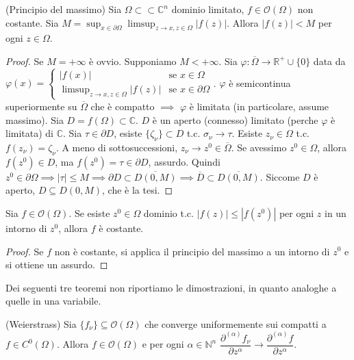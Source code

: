 \begin{thm}
  (Principio del massimo) Sia $\Omega \subset\subset \mathbb{C}^n$ dominio limitato, $f \in \mathcal{O}(\Omega)$ non costante. Sia $\displaystyle M=\sup_{x \in \partial \Omega} \limsup_{z \longrightarrow x, z \in \Omega} |f(z)|$. Allora $|f(z)|<M$ per ogni $z \in \Omega$.
\end{thm}

\begin{proof}
  Se $M=+\infty$ è ovvio. Supponiamo $M<+\infty$. Sia $\varphi: \overline{\Omega} \longrightarrow \mathbb{R}^+\cup\{0\}$ data da $\varphi(x)=\begin{cases}
    |f(x)| & \mbox{se }x\in\Omega \\ \limsup_{z \longrightarrow x, z \in \Omega} |f(z)| & \mbox{se }x \in \partial\Omega
\end{cases}$. $\varphi$ è semicontinua superiormente su $\overline{\Omega}$ che è compatto $\implies$ $\varphi$ è limitata (in particolare, assume massimo).
Sia $D=f(\Omega) \subset \mathbb{C}$. $D$ è un aperto (connesso) limitato (perche $\varphi$ è limitata) di $\mathbb{C}$. Sia $\tau \in \partial D$, esiste $\{\zeta_{\nu}\} \subset D$ t.c. $\sigma_{\nu} \longrightarrow \tau$. Esiste $z_{\nu} \in \Omega$ t.c. $f(z_{\nu})=\zeta_{\nu}$.
A meno di sottosuccessioni, $z_{\nu} \longrightarrow z^0 \in \overline{\Omega}$. Se avessimo $z^0 \in \Omega$, allora $f(z^0) \in D$, ma $f(z^0)=\tau \in \partial D$, assurdo.
Quindi $z^0 \in \partial\Omega \implies |\tau| \le M \implies \partial D \subset \overline{D(0,M)} \implies \overline{D} \subset \overline{D(0,M)}$. Siccome $D$ è aperto, $D \subseteq D(0,M)$, che è la tesi.
\end{proof}

\begin{cor}
  Sia $f \in \mathcal{O}(\Omega)$. Se esiste $z^0 \in \Omega$ dominio t.c. $|f(z)| \le |f(z^0)|$ per ogni $z$ in un intorno di $z^0$, allora $f$ è costante.
\end{cor}

\begin{proof}
  Se $f$ non è costante, si applica il principio del massimo a un intorno di $z^0$ e si ottiene un assurdo.
\end{proof}

Dei seguenti tre teoremi non riportiamo le dimostrazioni, in quanto analoghe a quelle in una variabile.

\begin{thm}
  (Weierstrass) Sia $\{f_{\nu}\} \subseteq \mathcal{O}(\Omega)$ che converge uniformemente sui compatti a $f \in C^0(\Omega)$. Allora $f \in \mathcal{O}(\Omega)$ e per ogni $\alpha \in \mathbb{N}^n$ $\dfrac{\partial^{(\alpha)}f_{\nu}}{\partial z^\alpha} \longrightarrow \dfrac{\partial^{(\alpha)}f}{\partial z^\alpha}$.
\end{thm}

